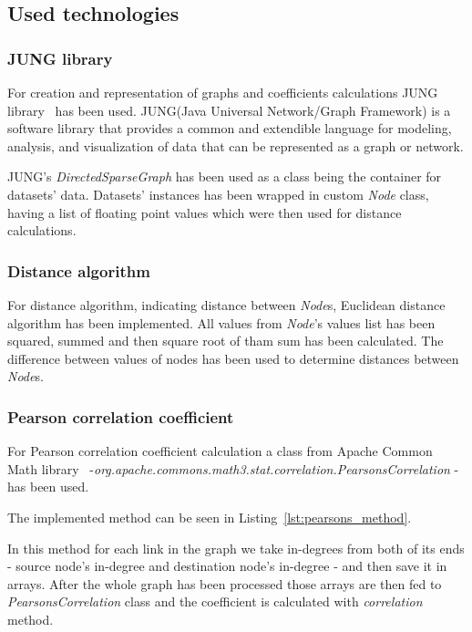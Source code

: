 \subsection{Used technologies}


\subsubsection{JUNG library}
For creation and representation of graphs and coefficients calculations JUNG library~\cite{jung} has been used.
JUNG(Java Universal Network/Graph Framework) is a software library that provides a common and extendible language for modeling, analysis, and visualization of data that can be represented as a graph or network.

JUNG's \emph{DirectedSparseGraph} has been used as a class being the container for datasets' data.
Datasets' instances has been wrapped in custom \emph{Node} class, having a list of floating point values which were then used for distance calculations.


\subsubsection{Distance algorithm}
For distance algorithm, indicating distance between \emph{Node}s, Euclidean distance algorithm has been implemented.
All values from \emph{Node}'s values list has been squared, summed and then square root of tham sum has been calculated.
The difference between values of nodes has been used to determine distances between \emph{Node}s.


\subsubsection{Pearson correlation coefficient}
For Pearson correlation coefficient calculation a class from Apache Common Math library~\cite{apache_common_math} -\emph{org.apache.commons.math3.stat.correlation.PearsonsCorrelation} - has been used.

The implemented method can be seen in Listing~\ref{lst:pearsons_method}.

In this method for each link in the graph we take in-degrees from both of its ends - source node's in-degree and  destination node's in-degree - and then save it in arrays.
After the whole graph has been processed those arrays are then fed to \emph{PearsonsCorrelation} class and the coefficient is calculated with \emph{correlation} method.

